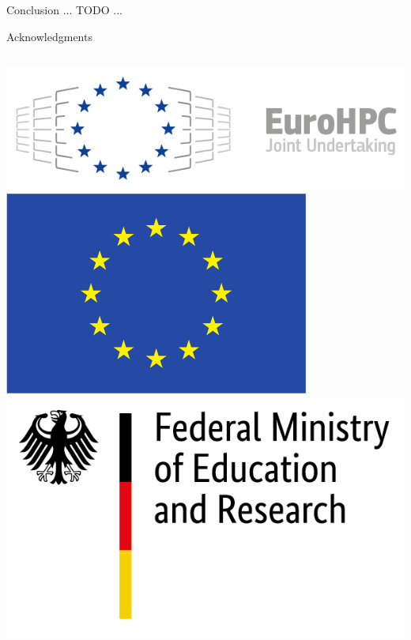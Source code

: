 \documentclass[11pt,aspectratio=43]{beamer}
\begin{document}
\begin{frame}{Conclusion}
	... TODO ...
\end{frame}

\begin{frame}{Acknowledgments}
	\scriptsize\vspace*{-15pt}
	\begin{columns}
		\includegraphics[width=\linewidth]{EuroHPC.jpg}
		\includegraphics[width=\linewidth]{logo_eu.png}
		\includegraphics[width=\linewidth]{BMBF_gefoerdert_2017_en.jpg}

\end{columns}
\end{frame}
\end{document}
